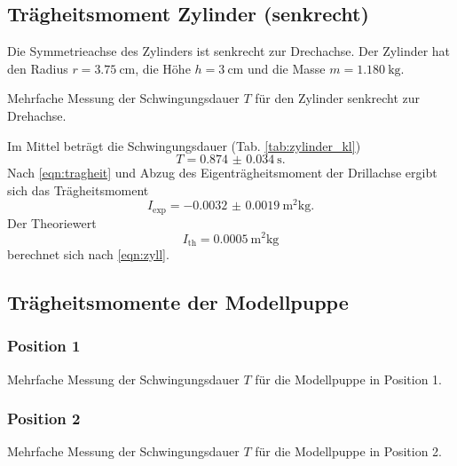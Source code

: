 \subsection{Trägheitsmoment Zylinder (senkrecht)}
Die Symmetrieachse des Zylinders ist senkrecht zur Drechachse.
Der Zylinder hat den Radius $r = \SI{3.75}{\centi\metre}$, die Höhe $h = \SI{3}{\centi\metre}$ und die Masse $m = \SI{1.180}{\kg}$.
\begin{table}
    \centering
    \caption{Mehrfache Messung der Schwingungsdauer $T$ für den Zylinder senkrecht zur Drehachse.}
    \label{tab:zylinder_kl}  
\end{table}
\FloatBarrier
Im Mittel beträgt die Schwingungsdauer (Tab. \ref{tab:zylinder_kl})
\begin{equation*}
    T = \SI{0.874(34)}{\second} .
\end{equation*}
Nach \autoref{eqn:tragheit} und Abzug des Eigenträgheitsmoment der Drillachse ergibt sich das Trägheitsmoment
\begin{equation}
    I_\text{exp} = \SI{-0.0032(19)}{\metre^2\kg} .
\end{equation}
Der Theoriewert
\begin{equation}
    I_\text{th} = \SI{0.0005}{\metre^2\kg}
\end{equation}
berechnet sich nach \autoref{eqn:zyll}.
\subsection{Trägheitsmomente der Modellpuppe}
\subsubsection{Position 1}
\begin{table}
    \centering
    \caption{Mehrfache Messung der Schwingungsdauer $T$ für die Modellpuppe in Position 1.}
    \label{tab:modellpuppe1}  
\end{table}
\FloatBarrier

\subsubsection{Position 2}
\begin{table}
    \centering
    \caption{Mehrfache Messung der Schwingungsdauer $T$ für die Modellpuppe in Position 2.}
    \label{tab:modellpuppe2}  
\end{table}
\FloatBarrier